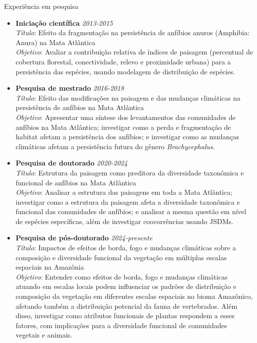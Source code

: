 \documentclass{resume}
\begin{document}
\begin{rSection}{Experiência em pesquisa}
\begin{itemize}
\item {\bf Iniciação científica} \hfill{\em 2013-2015}\\
{\it Título}: Efeito da fragmentação na persistência de anfíbios anuros (Amphibia: Anura) na Mata Atlântica\\
{\it Objetivo}: Avaliar a contribuição relativa de índices de paisagem (percentual de cobertura florestal, conectividade, relevo e proximidade urbana) para a persistência das espécies, usando modelagem de distribuição de espécies.

\item {\bf Pesquisa de mestrado} \hfill{\em 2016-2018}\\
{\it Título}: Efeito das modificações na paisagem e das mudanças climáticas na persistência de anfíbios na Mata Atlântica\\
{\it Objetivo}: Apresentar uma síntese dos levantamentos das comunidades de anfíbios na Mata Atlântica; investigar como a perda e fragmentação de habitat afetam a persistência dos anfíbios; e investigar como as mudanças climáticas afetam a persistência futura do gênero {\it Brachycephalus}.

\item {\bf Pesquisa de doutorado} \hfill{\em 2020-2024}\\
{\it Título}: Estrutura da paisagem como preditora da diversidade taxonômica e funcional de anfíbios na Mata Atlântica\\
{\it Objetivo}: Analisar a estrutura das paisagens em toda a Mata Atlântica; investigar como a estrutura da paisagem afeta a diversidade taxonômica e funcional das comunidades de anfíbios; e analisar a mesma questão em nível de espécies específicas, além de investigar coocorrências usando JSDMs.

\item {\bf Pesquisa de pós-doutorado} \hfill{\em 2024-presente}\\
{\it Título}: Impactos de efeitos de borda, fogo e mudanças climáticas sobre a composição e diversidade funcional da vegetação em múltiplas escalas espaciais na Amazônia\\
{\it Objetivo}: Entender como efeitos de borda, fogo e mudanças climáticas atuando em escalas locais podem influenciar os padrões de distribuição e composição da vegetação em diferentes escalas espaciais no bioma Amazônico, afetando também a distribuição potencial da fauna de vertebrados. Além disso, investigar como atributos funcionais de plantas respondem a esses fatores, com implicações para a diversidade funcional de comunidades vegetais e animais.
\end{itemize}
\end{rSection}
\end{document}
